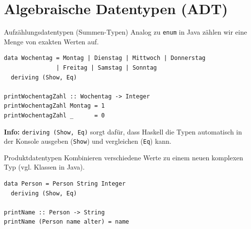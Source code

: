 \documentclass[aspectratio=169,11pt]{beamer}
\begin{document}
\section{Algebraische Datentypen (ADT)}

\begin{frame}[fragile]{Aufzählungsdatentypen (Summen-Typen)}
    Analog zu \texttt{enum} in Java zählen wir eine Menge von exakten Werten auf.
    
    \begin{tcolorbox}[modernbox, title=Beispiel: Wochentag]
\begin{lstlisting}
data Wochentag = Montag | Dienstag | Mittwoch | Donnerstag 
               | Freitag | Samstag | Sonntag
  deriving (Show, Eq)

printWochentagZahl :: Wochentag -> Integer
printWochentagZahl Montag = 1
printWochentagZahl _      = 0
\end{lstlisting}
    \end{tcolorbox}
    \small \textbf{Info:} \texttt{deriving (Show, Eq)} sorgt dafür, dass Haskell die Typen automatisch in der Konsole ausgeben (\texttt{Show}) und vergleichen (\texttt{Eq}) kann.
\end{frame}

\begin{frame}[fragile]{Produktdatentypen}
    Kombinieren verschiedene Werte zu einem neuen komplexen Typ (vgl. Klassen in Java).
    
    \begin{tcolorbox}[modernbox, title=Beispiel: Person]
\begin{lstlisting}
data Person = Person String Integer 
  deriving (Show, Eq)

printName :: Person -> String
printName (Person name alter) = name
\end{lstlisting}
    \end{tcolorbox}
\end{frame}
\end{document}
